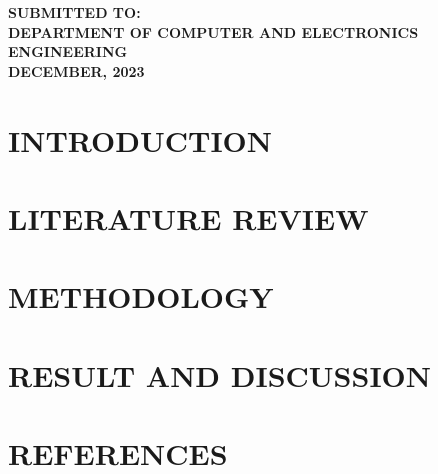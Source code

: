 \documentclass[a4paper,12pt]{report}
\begin{document}
\begin{titlepage}
\begin{center}
{\large \uppercase{\textbf{submitted to:}}}\\[0.4cm]

{\large \uppercase{\textbf{Department of computer and electronics\\[0.5cm]engineering}}}\\[0.6cm]

{\large \uppercase{\textbf{december, 2023}}}

\end{center}
\end{titlepage}
\begin{center}
\renewcommand{\contentsname}{\uppercase{table of contents}}
\tableofcontents    
\end{center}

\chapter{\uppercase{Introduction}}

\chapter{\uppercase{literature review}}

\chapter{\uppercase{methodology}}

\chapter{\uppercase{Result and discussion}}

\chapter{\uppercase{references}}
\end{document}
